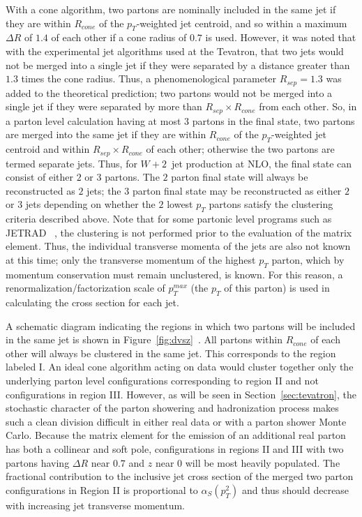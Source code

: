 \documentclass[12pt]{iopart}
\def\as{\alpha_S}
\begin{document}
With a cone algorithm, two partons are nominally included in the same  jet if they are within $R_{cone}$ of the
$p_T$-weighted jet centroid, and so within a maximum $\Delta R$ of $1.4$ of each other if a cone 
radius of $0.7$ is used. However, it was noted that with the experimental jet algorithms used 
at the Tevatron, that two jets would not be merged into a single jet if they were separated 
by a distance greater than $1.3$ times the cone radius. Thus, a phenomenological parameter 
$R_{sep}=1.3$ was added to the theoretical prediction; two partons would not be merged 
into a single jet if they were separated by more than $R_{sep} \times R_{cone}$ from each other. 
So, in a parton level calculation having at most $3$ partons in the final state, two partons
are merged into the same jet if they are within 
$R_{cone}$ of the $p_T$-weighted jet centroid and within  $R_{sep} \times R_{cone}$ of  each other; 
otherwise the two partons are termed separate jets.  Thus, for $W+2$~jet production at 
NLO, the final state can consist of either $2$ or $3$ partons. The $2$ parton final state will 
always be reconstructed as $2$ jets; the $3$ parton final state may be reconstructed as either 
$2$ or $3$ jets depending on whether the $2$ lowest $p_T$ partons satisfy the clustering 
criteria described above. Note that for some partonic level programs such as JETRAD~\cite{Giele:1994gf}
, 
the clustering is not performed prior to the evaluation of the matrix element. Thus, 
the individual transverse momenta of the jets are also not known at this time; only 
the transverse momentum of the highest $p_T$ parton, which by momentum conservation 
must remain unclustered, is known. For this reason, a renormalization/factorization 
scale of $p_T^{max}$ (the $p_T$ of this parton) is used in calculating the cross 
section for each jet. 

 A schematic diagram indicating the regions in which two partons will be included 
in the same jet is shown in Figure~\ref{fig:dvsz}~\cite{Ellis:2001aa}.  All partons within 
$R_{cone}$ of each other will always be clustered in the same jet. This corresponds to 
the region labeled I. An ideal cone algorithm acting on data would cluster together only 
the underlying parton level configurations corresponding to region II and not configurations 
in region III. However, as will be seen in Section~\ref{sec:tevatron}, the stochastic character of the parton 
showering and hadronization process makes such a clean division difficult in either real data 
or with a parton shower Monte Carlo. Because the matrix element for the emission of an 
additional real parton has both a collinear and soft pole, configurations in regions 
II and III with two partons having  $\Delta R$ near $0.7$ and $z$ near $0$ will be most  
heavily populated. The fractional contribution to the inclusive jet cross section of the merged two
parton configurations in Region II is proportional to $\as(p_T^2)$ and thus should decrease with
increasing jet transverse momentum. 
\end{document}
